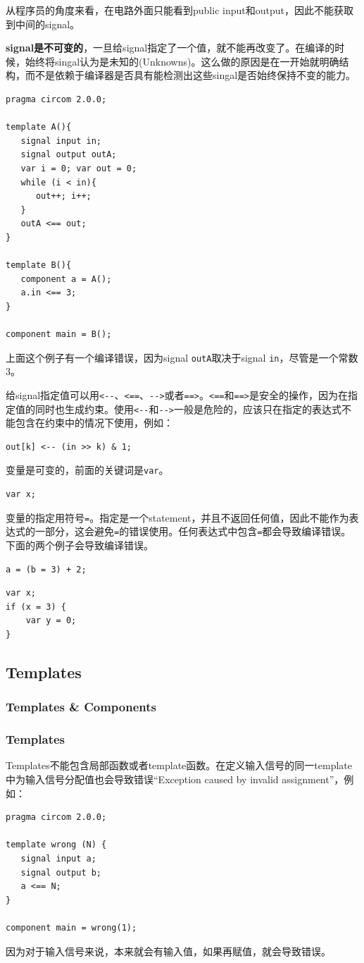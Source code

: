 \documentclass[10pt]{ctexart}
\begin{document}
从程序员的角度来看，在电路外面只能看到public input和output，因此不能获取到中间的signal。

\textbf{signal是不可变的}，一旦给signal指定了一个值，就不能再改变了。在编译的时候，始终将singal认为是未知的(Unknowns)。这么做的原因是在一开始就明确结构，而不是依赖于编译器是否具有能检测出这些singal是否始终保持不变的能力。
\begin{lstlisting}
pragma circom 2.0.0;

template A(){
   signal input in;
   signal output outA; 
   var i = 0; var out = 0;
   while (i < in){
      out++; i++;
   }
   outA <== out;
}

template B(){
   component a = A();
   a.in <== 3;
}

component main = B();
\end{lstlisting}
上面这个例子有一个编译错误，因为signal \verb|outA|取决于signal \verb|in|，尽管是一个常数3。

给signal指定值可以用\verb|<--|、\verb|<==|、\verb|-->|或者\verb|==>|。\verb|<==|和\verb|==>|是安全的操作，因为在指定值的同时也生成约束。使用\verb|<--|和\verb|-->|一般是危险的，应该只在指定的表达式不能包含在约束中的情况下使用，例如：
\begin{lstlisting}
out[k] <-- (in >> k) & 1;
\end{lstlisting}

变量是可变的，前面的关键词是\verb|var|。
\begin{lstlisting}
var x;
\end{lstlisting}
变量的指定用符号\verb|=|。指定是一个statement，并且不返回任何值，因此不能作为表达式的一部分，这会避免\verb|=|的错误使用。任何表达式中包含\verb|=|都会导致编译错误。下面的两个例子会导致编译错误。

\begin{lstlisting}
a = (b = 3) + 2;
\end{lstlisting}
\begin{lstlisting}
var x;
if (x = 3) {
	var y = 0;
}
\end{lstlisting}

\subsection{Templates}
\subsubsection{Templates \& Components}
\subsubsection*{Templates}
Templates不能包含局部函数或者template函数。在定义输入信号的同一template中为输入信号分配值也会导致错误“Exception caused by invalid assignment”，例如：
\begin{lstlisting}
pragma circom 2.0.0;

template wrong (N) {
   signal input a;
   signal output b;
   a <== N;
}

component main = wrong(1);	
\end{lstlisting}
因为对于输入信号来说，本来就会有输入值，如果再赋值，就会导致错误。
\end{document}
